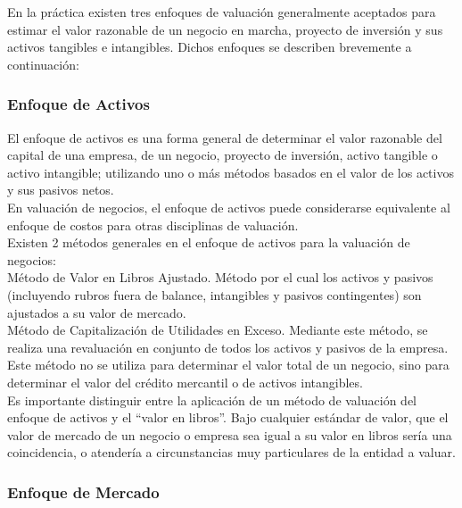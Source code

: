 En la pr\'actica existen tres enfoques de valuaci\'on generalmente aceptados para estimar el valor razonable de un negocio en marcha, proyecto de inversi\'on y sus activos tangibles e intangibles. Dichos enfoques se describen brevemente a continuaci\'on:


\subsubsection{Enfoque de Activos}

El enfoque de activos es una forma general de determinar el valor razonable del capital de una empresa, de un negocio, proyecto de inversi\'on, activo tangible o activo intangible; utilizando uno o m\'as m\'etodos basados en el valor de los activos y sus pasivos netos.\\[10pt]

En valuaci\'on de negocios, el enfoque de activos puede considerarse equivalente al enfoque de costos para otras disciplinas de valuaci\'on.\\[10pt]

Existen 2 m\'etodos generales en el enfoque de activos para la valuaci\'on de negocios:\\[10pt]

\textcolor{secundario}{M\'etodo de Valor en Libros Ajustado.} M\'etodo por el cual los activos y pasivos (incluyendo rubros fuera de balance, intangibles y pasivos contingentes) son ajustados a su valor de mercado.\\[10pt]

\textcolor{secundario}{M\'etodo de Capitalizaci\'on de Utilidades en Exceso.} Mediante este m\'etodo, se realiza una revaluaci\'on en conjunto de todos los activos y pasivos de la empresa. Este m\'etodo no se utiliza para determinar el valor total de un negocio, sino para determinar el valor del cr\'edito mercantil o de activos intangibles.\\[10pt]

Es importante distinguir entre la aplicaci\'on de un m\'etodo de valuaci\'on del enfoque de activos y el ``valor en libros''. Bajo cualquier est\'andar de valor, que el valor de mercado de un negocio o empresa sea igual a su valor en libros ser\'ia una coincidencia, o atender\'ia a circunstancias muy particulares de la entidad a valuar.

\subsubsection{Enfoque de Mercado}

